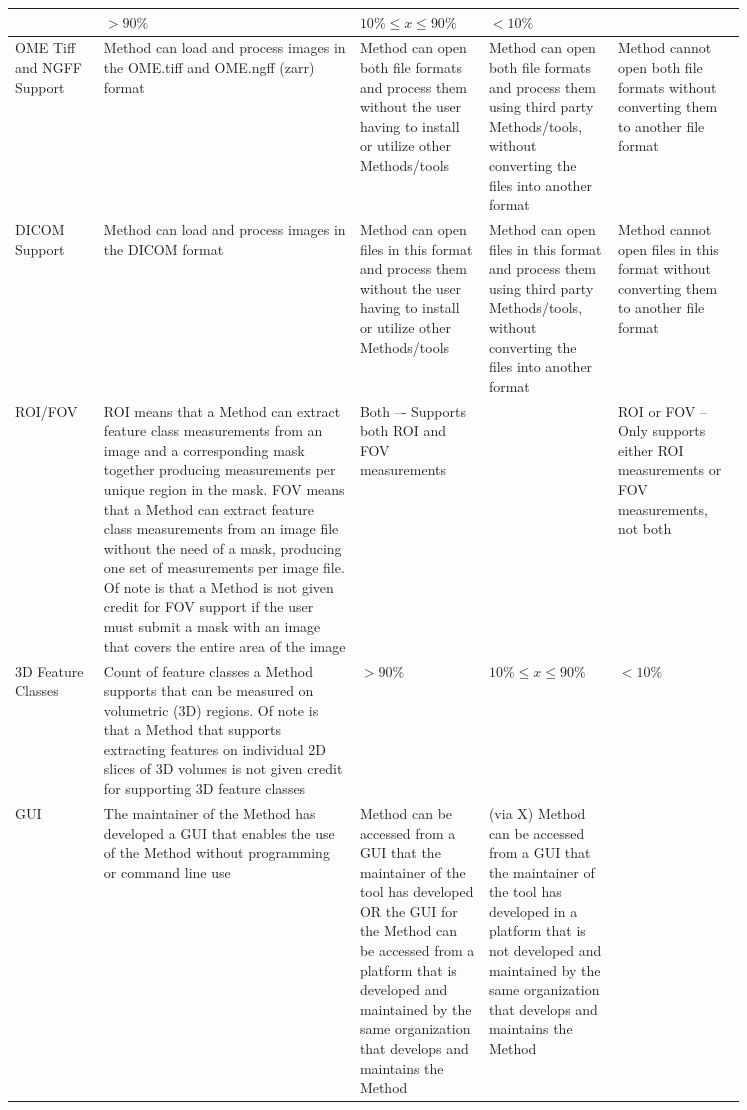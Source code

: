 \documentclass[sn-mathphys,Numbered]{sn-jnl}%
\theoremstyle{thmstyleone}%
\theoremstyle{thmstyletwo}%
\theoremstyle{thmstylethree}%
\begin{document}
\begin{table}
\begin{tiny}
\begin{tabular} {p{0.1\linewidth} | p{0.3\linewidth} | p{0.15\linewidth} | p{0.15\linewidth} | p{0.15\linewidth}}
 & $>90\%$
 & $10\% \leqslant x \leqslant 90\%$
 & $< 10\%$
 \\
 \hline
OME Tiff and NGFF Support
 & Method can load and process images in the OME.tiff and OME.ngff (zarr) format
 & Method can open both file formats and process them without the user having to install or utilize other Methods/tools
 & Method can open both file formats and process them using third party Methods/tools, without converting the files into another format
 & Method cannot open both file formats without converting them to another file format
 \\
 \hline
DICOM Support
 & Method can load and process images in the DICOM format
 & Method can open files in this format and process them without the user having to install or utilize other Methods/tools
 & Method can open files in this format and process them using third party Methods/tools, without converting the files into another format
 & Method cannot open files in this format without converting them to another file format
 \\
 \hline
ROI/FOV
 & ROI means that a Method can extract feature class measurements from an image and a corresponding mask together producing measurements per unique region in the mask. FOV means that a Method can extract feature class measurements from an image file without the need of a mask, producing one  set of measurements per image file. Of note is that a Method is not given credit for FOV support if the user must submit a mask with an image that covers the entire area of the image
 & Both –- Supports both ROI and FOV measurements
 &
 & ROI or FOV -- Only supports either ROI measurements or FOV measurements, not both
 \\
 \hline
3D Feature Classes
 & Count of feature classes a Method supports that can be measured on volumetric (3D) regions. Of note is that a Method that supports extracting features on individual 2D slices of 3D volumes is not given credit for supporting 3D feature classes
 & $>90\%$
 & $10\% \leqslant x \leqslant 90\%$
 & $< 10\%$
 \\
 \hline
GUI
 & The maintainer of the Method has developed a GUI that enables the use of the Method without programming or command line use
 & Method can be accessed from a GUI that the maintainer of the tool has developed OR the GUI for the Method can be accessed from a platform that is developed and maintained by the same organization that develops and maintains the Method
 & (via X) Method can be accessed from a GUI that the maintainer of the tool has developed in a platform that is not developed and maintained by the same organization that develops and maintains the Method

\end{tabular}
\end{tiny}
\end{table}
\end{document}
